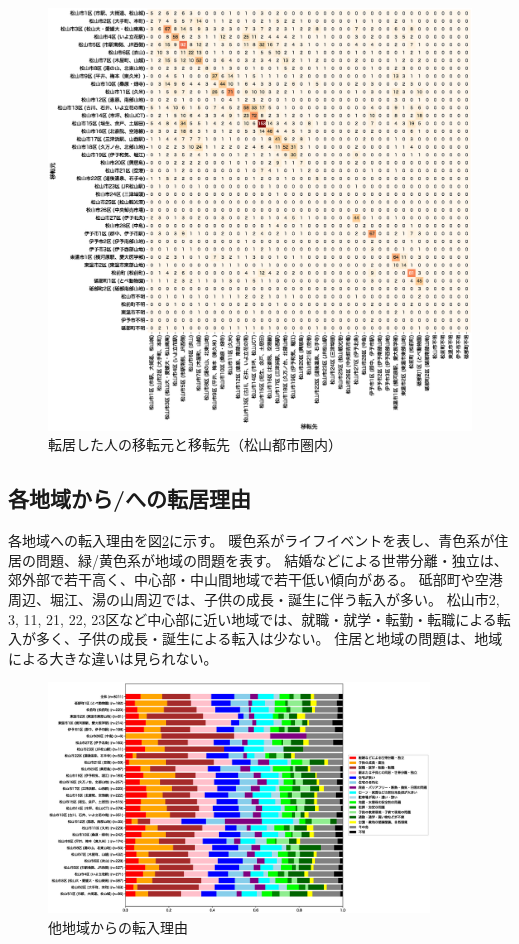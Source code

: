 \documentclass[a4paper,12pt, uplatex]{jsbook}
\begin{document}
\begin{figure}[H]
    \centering
    \includegraphics[width=\textwidth]{picture/OD_inside_matsuyama.eps}
    \caption{転居した人の移転元と移転先（松山都市圏内）}
    \label{fig:OD_inside_matsuyama}
\end{figure}


\subsection{各地域から/への転居理由}
各地域への転入理由を図\ref{fig:reason_ratio_come}に示す。
暖色系がライフイベントを表し、青色系が住居の問題、緑/黄色系が地域の問題を表す。
結婚などによる世帯分離・独立は、郊外部で若干高く、中心部・中山間地域で若干低い傾向がある。
砥部町や空港周辺、堀江、湯の山周辺では、子供の成長・誕生に伴う転入が多い。
松山市2, 3, 11, 21, 22, 23区など中心部に近い地域では、就職・就学・転勤・転職による転入が多く、子供の成長・誕生による転入は少ない。
住居と地域の問題は、地域による大きな違いは見られない。
%
\begin{figure}[H]
    \centering
    \includegraphics[width=0.9\textwidth]{picture/reason_ratio_come.eps}
    \caption{他地域からの転入理由}
    \label{fig:reason_ratio_come}
\end{figure}
\end{document}
